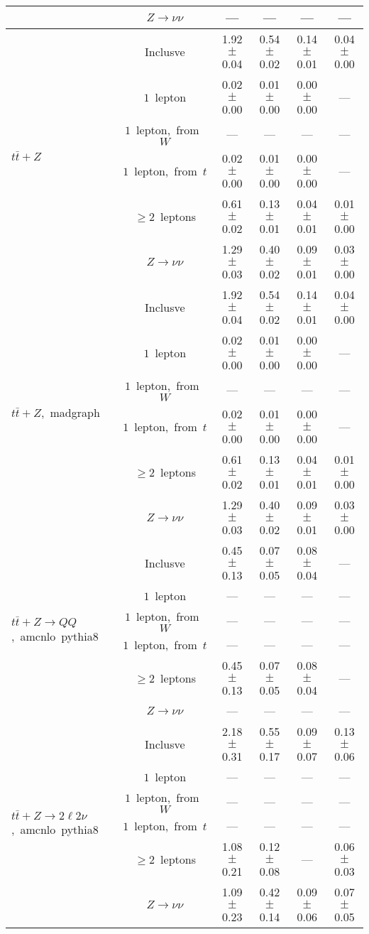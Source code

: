 \documentclass{article}
\begin{document}
\begin{longtable}{|l|c|c|c|c|c|}
 & $Z\rightarrow\nu\nu$  & ---  & ---  & ---  & --- \\* 
\hline 
\multirow{6}{*}{$t\bar{t}+Z$} & Inclusve  & 1.92 $\pm$ 0.04  & 0.54 $\pm$ 0.02  & 0.14 $\pm$ 0.01  & 0.04 $\pm$ 0.00 \\* 
 & $1$~lepton  & 0.02 $\pm$ 0.00  & 0.01 $\pm$ 0.00  & 0.00 $\pm$ 0.00  & --- \\* 
 & $1$~lepton,~from~$W$  & ---  & ---  & ---  & --- \\* 
 & $1$~lepton,~from~$t$  & 0.02 $\pm$ 0.00  & 0.01 $\pm$ 0.00  & 0.00 $\pm$ 0.00  & --- \\* 
 & $\ge2$~leptons  & 0.61 $\pm$ 0.02  & 0.13 $\pm$ 0.01  & 0.04 $\pm$ 0.01  & 0.01 $\pm$ 0.00 \\* 
 & $Z\rightarrow\nu\nu$  & 1.29 $\pm$ 0.03  & 0.40 $\pm$ 0.02  & 0.09 $\pm$ 0.01  & 0.03 $\pm$ 0.00 \\* 
\hline 
\multirow{6}{*}{$t\bar{t}+Z$,~madgraph} & Inclusve  & 1.92 $\pm$ 0.04  & 0.54 $\pm$ 0.02  & 0.14 $\pm$ 0.01  & 0.04 $\pm$ 0.00 \\* 
 & $1$~lepton  & 0.02 $\pm$ 0.00  & 0.01 $\pm$ 0.00  & 0.00 $\pm$ 0.00  & --- \\* 
 & $1$~lepton,~from~$W$  & ---  & ---  & ---  & --- \\* 
 & $1$~lepton,~from~$t$  & 0.02 $\pm$ 0.00  & 0.01 $\pm$ 0.00  & 0.00 $\pm$ 0.00  & --- \\* 
 & $\ge2$~leptons  & 0.61 $\pm$ 0.02  & 0.13 $\pm$ 0.01  & 0.04 $\pm$ 0.01  & 0.01 $\pm$ 0.00 \\* 
 & $Z\rightarrow\nu\nu$  & 1.29 $\pm$ 0.03  & 0.40 $\pm$ 0.02  & 0.09 $\pm$ 0.01  & 0.03 $\pm$ 0.00 \\* 
\hline 
\multirow{6}{*}{$t\bar{t}+Z{\rightarrow}QQ$,~amcnlo~pythia8} & Inclusve  & 0.45 $\pm$ 0.13  & 0.07 $\pm$ 0.05  & 0.08 $\pm$ 0.04  & --- \\* 
 & $1$~lepton  & ---  & ---  & ---  & --- \\* 
 & $1$~lepton,~from~$W$  & ---  & ---  & ---  & --- \\* 
 & $1$~lepton,~from~$t$  & ---  & ---  & ---  & --- \\* 
 & $\ge2$~leptons  & 0.45 $\pm$ 0.13  & 0.07 $\pm$ 0.05  & 0.08 $\pm$ 0.04  & --- \\* 
 & $Z\rightarrow\nu\nu$  & ---  & ---  & ---  & --- \\* 
\hline 
\multirow{6}{*}{$t\bar{t}+Z{\rightarrow}2{\ell}2{\nu}$,~amcnlo~pythia8} & Inclusve  & 2.18 $\pm$ 0.31  & 0.55 $\pm$ 0.17  & 0.09 $\pm$ 0.07  & 0.13 $\pm$ 0.06 \\* 
 & $1$~lepton  & ---  & ---  & ---  & --- \\* 
 & $1$~lepton,~from~$W$  & ---  & ---  & ---  & --- \\* 
 & $1$~lepton,~from~$t$  & ---  & ---  & ---  & --- \\* 
 & $\ge2$~leptons  & 1.08 $\pm$ 0.21  & 0.12 $\pm$ 0.08  & ---  & 0.06 $\pm$ 0.03 \\* 
 & $Z\rightarrow\nu\nu$  & 1.09 $\pm$ 0.23  & 0.42 $\pm$ 0.14  & 0.09 $\pm$ 0.06  & 0.07 $\pm$ 0.05 \\* 
\hline 
\end{longtable} 
\end{document}
